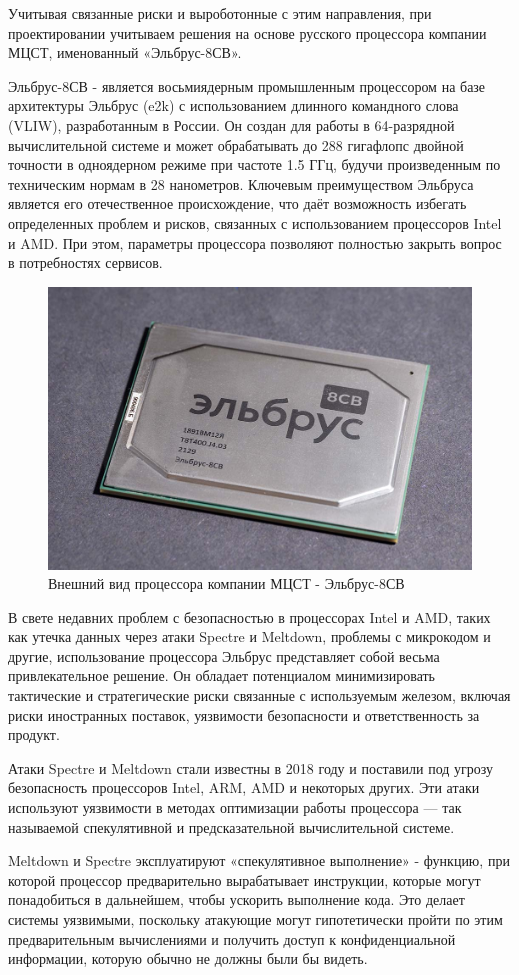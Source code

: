Учитывая связанные риски и выроботонные с этим направления, при проектировании учитываем решения на основе русского процессора компании МЦСТ, именованный «Эльбрус-8СВ».

Эльбрус-8СВ - является восьмиядерным промышленным процессором на базе архитектуры Эльбрус (e2k) с использованием длинного командного слова (VLIW), разработанным в России. Он создан для работы в 64-разрядной вычислительной системе и может обрабатывать до 288 гигафлопс двойной точности в одноядерном режиме при частоте 1.5 ГГц, будучи произведенным по техническим нормам в 28 нанометров. Ключевым преимуществом Эльбруса является его отечественное происхождение, что даёт возможность избегать определенных проблем и рисков, связанных с использованием процессоров Intel и AMD. При этом, параметры процессора позволяют полностью закрыть вопрос в потребностях сервисов.

\begin{figure}
  \centering
  \includegraphics[width=.6\textwidth]{graphics/img/elbrus}
  \caption{Внешний вид процессора компании МЦСТ - Эльбрус-8СВ}
  \label{fig:mono}
\end{figure}

В свете недавних проблем с безопасностью в процессорах Intel и AMD, таких как утечка данных через атаки Spectre и Meltdown, проблемы с микрокодом и другие, использование процессора Эльбрус представляет собой весьма привлекательное решение. Он обладает потенциалом минимизировать тактические и стратегические риски связанные с используемым железом, включая риски иностранных поставок, уязвимости безопасности и ответственность за продукт.

Атаки Spectre и Meltdown стали известны в 2018 году и поставили под угрозу безопасность процессоров Intel, ARM, AMD и некоторых других. Эти атаки используют уязвимости в методах оптимизации работы процессора — так называемой спекулятивной и предсказательной вычислительной системе.

Meltdown и Spectre эксплуатируют «спекулятивное выполнение» \cite{risk:spectual_hack} - функцию, при которой процессор предварительно вырабатывает инструкции, которые могут понадобиться в дальнейшем, чтобы ускорить выполнение кода. Это делает системы уязвимыми, поскольку атакующие могут гипотетически пройти по этим предварительным вычислениями и получить доступ к конфиденциальной информации, которую обычно не должны были бы видеть.


